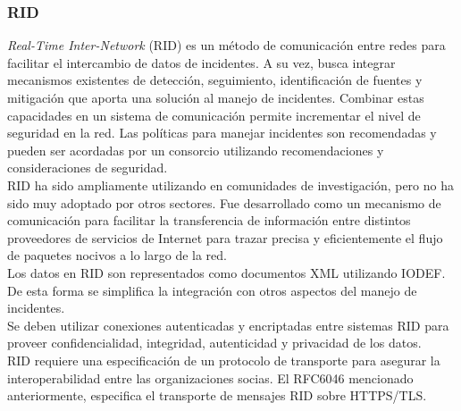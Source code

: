 \subsubsection{RID}

\textit{Real-Time Inter-Network} (RID) es un método de comunicación entre redes para 
facilitar el intercambio de datos de incidentes. A su vez, busca integrar 
mecanismos existentes de detección, seguimiento, identificación de fuentes y 
mitigación que aporta una solución al manejo de incidentes. Combinar estas 
capacidades en un sistema de comunicación permite incrementar el nivel de 
seguridad en la red. Las políticas para manejar incidentes son recomendadas y 
pueden ser acordadas por un consorcio utilizando recomendaciones y 
consideraciones de seguridad.\\

RID ha sido ampliamente utilizando en comunidades de investigación, pero no ha 
sido muy adoptado por otros sectores. Fue desarrollado como un mecanismo de 
comunicación para facilitar la transferencia de información entre distintos 
proveedores de servicios de Internet para trazar precisa y eficientemente el 
flujo de paquetes nocivos a lo largo de la red.\\

Los datos en RID son representados como documentos XML utilizando IODEF. De esta 
forma se simplifica la integración con otros aspectos del manejo de incidentes.\\ 

Se deben utilizar 
conexiones autenticadas y encriptadas entre sistemas RID para proveer 
confidencialidad, integridad, autenticidad y privacidad de los datos. \\

RID requiere una 
especificación de un protocolo de transporte para asegurar la interoperabilidad 
entre las organizaciones socias. El RFC6046 mencionado anteriormente, especifica 
el transporte de mensajes RID sobre HTTPS/TLS. 












